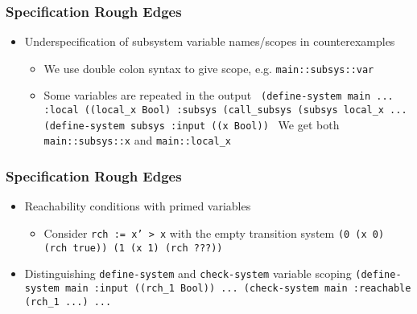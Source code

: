 \documentclass[11pt,xcolor={dvipsnames},hyperref={pdftex,pdfpagemode=UseNone,hidelinks,pdfdisplaydoctitle=true},usepdftitle=false]{beamer}
\newcommand{\code}[1]{{\footnotesize\texttt{#1}}}
\begin{document}
\begin{frame}
    \frametitle{Specification Rough Edges}
    \begin{itemize}
        \item Underspecification of subsystem variable names/scopes in counterexamples \pause
        \begin{itemize}
            \item We use double colon syntax to give scope, e.g. \code{main::subsys::var} \pause
            \item Some variables are repeated in the output \newline 
            \code {
                (define-system main ... \newline 
                    \hspace{1cm} :local ((local\_x Bool)  \newline 
                    :subsys (call\_subsys (subsys local\_x ... \newline 
                (define-system subsys \newline
                    :input ((x Bool)) \newline
            } 
            We get both \code{main::subsys::x} and \code{main::local\_x}
        \end{itemize}
    \end{itemize}
\end{frame}

\begin{frame}
    \frametitle{Specification Rough Edges}
    \begin{itemize}
        \item Reachability conditions with primed variables \pause
        \begin{itemize}
            \item Consider \code{rch := x' > x} with the empty transition system \newline 
            \code{(0 (x 0) (rch true)) \newline
            (1 (x 1) (rch ???))}
        \end{itemize} \pause
            \item Distinguishing \code{define-system} and \code{check-system} variable scoping \newline 
            \code{(define-system main :input ((rch\_1 Bool)) ...  \newline
         (check-system main :reachable (rch\_1 ...) ...}
    \end{itemize}
\end{frame}
\end{document}
